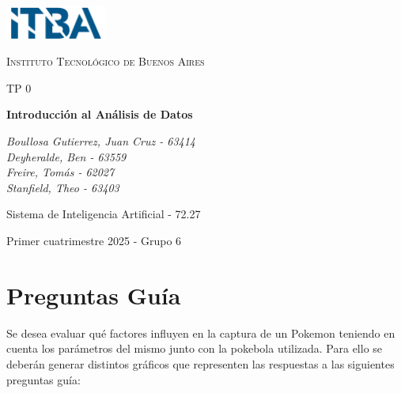 \documentclass[11pt]{article}
\begin{document}
\begin{titlepage}
  \centering
  \includegraphics[width=0.25\textwidth]{itba_logo}\par\vspace{1cm}
  {\textsc{Instituto Tecnológico de Buenos Aires} \par}
    \vspace{1cm}
    {\Large \textsc{TP 0}\par}
    \vspace{1.5cm}
    {\huge\bfseries Introducción al Análisis de Datos\par}
    \vspace{2cm}
    {\Large\itshape Boullosa Gutierrez, Juan Cruz - 63414\\
	Deyheralde, Ben - 63559\\
	Freire, Tomás - 62027\\
	Stanfield, Theo - 63403\par}
    \vfill
    Sistema de Inteligencia Artificial - 72.27
    \vfill
    {\large Primer cuatrimestre 2025 - Grupo 6\par}
\end{titlepage}

{
  \hypersetup{linkcolor=black}
  \tableofcontents
}

\newpage




\section{Preguntas Guía}\label{preguntas-guuxeda}

Se desea evaluar qué factores influyen en la captura de un Pokemon
teniendo en cuenta los parámetros del mismo junto con la pokebola
utilizada. Para ello se deberán generar distintos gráficos que
representen las respuestas a las siguientes preguntas guía:
\end{document}
